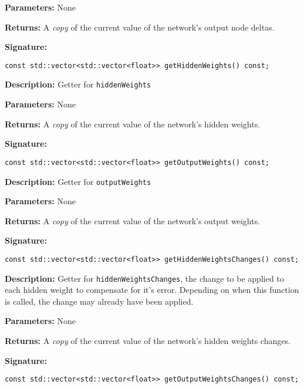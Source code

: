 \documentclass[a4paper]{article}
\begin{document}
\textbf{Parameters: } None

\textbf{Returns: }
A \textit{copy} of the current value of the network's output node deltas.

\hrulefill %

\textbf{Signature:} \begin{lstlisting}
const std::vector<std::vector<float>> getHiddenWeights() const;
\end{lstlisting}

\textbf{Description: }
Getter for \lstinline{hiddenWeights}

\textbf{Parameters: } None

\textbf{Returns: }
A \textit{copy} of the current value of the network's hidden weights.

\hrulefill %

\textbf{Signature:} \begin{lstlisting}
const std::vector<std::vector<float>> getOutputWeights() const;
\end{lstlisting}

\textbf{Description: }
Getter for \lstinline{outputWeights}

\textbf{Parameters: } None

\textbf{Returns: }
A \textit{copy} of the current value of the network's output weights.

\hrulefill %

\textbf{Signature:} \begin{lstlisting}
const std::vector<std::vector<float>> getHiddenWeightsChanges() const;
\end{lstlisting}

\textbf{Description: }
Getter for \lstinline{hiddenWeightsChanges}, the change to be applied to each hidden weight to compensate for it's error. Depending on when this function is called, the change may already have been applied.

\textbf{Parameters: } None

\textbf{Returns: }
A \textit{copy} of the current value of the network's hidden weights changes.

\hrulefill %
\newpage
\hrulefill

\textbf{Signature:} \begin{lstlisting}
const std::vector<std::vector<float>> getOutputWeightsChanges() const;
\end{lstlisting}
\end{document}
